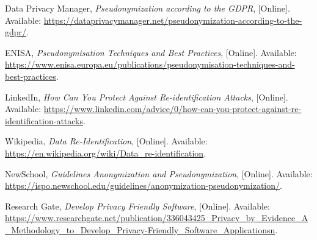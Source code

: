
\begin{thebibliography}{9}

  Data Privacy Manager,
  \textit{Pseudonymization according to the GDPR},
  [Online]. Available: \url{https://dataprivacymanager.net/pseudonymization-according-to-the-gdpr/}. 

  ENISA,
  \textit{Pseudonymisation Techniques and Best Practices},
  [Online]. Available: \url{https://www.enisa.europa.eu/publications/pseudonymisation-techniques-and-best-practices}.

  LinkedIn,
  \textit{How Can You Protect Against Re-identification Attacks},
  [Online]. Available: \url{  https://www.linkedin.com/advice/0/how-can-you-protect-against-re-identification-attacks}.

  Wikipedia,
  \textit{Data Re-Identification},
  [Online]. Available: \url{https://en.wikipedia.org/wiki/Data_re-identification}.

  NewSchool,
  \textit{Guidelines Anonymization and Pseudonymization},
  [Online]. Available: \url{https://ispo.newschool.edu/guidelines/anonymization-pseudonymization/}.

  Research Gate,
  \textit{Develop Privacy Friendly Software},
  [Online]. Available: \url{https://www.researchgate.net/publication/336043425_Privacy_by_Evidence_A_Methodology_to_Develop_Privacy-Friendly_Software_Applicationsn}.


\end{thebibliography}